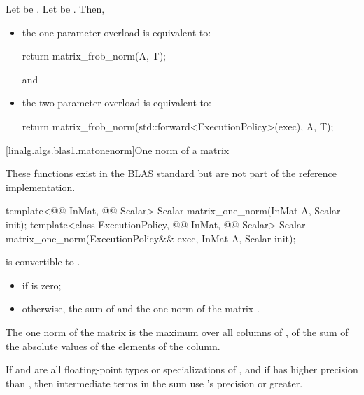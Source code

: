 \begin{itemdescr}
\pnum
\effects
Let  be
.
Let  be
.
Then,
\begin{itemize}
\item
the one-parameter overload is equivalent to:
\begin{codeblock}
return matrix_frob_norm(A, T{});
\end{codeblock}
and
\item
the two-parameter overload is equivalent to:
\begin{codeblock}
return matrix_frob_norm(std::forward<ExecutionPolicy>(exec), A, T{});
\end{codeblock}
\end{itemize}
\end{itemdescr}

[linalg.algs.blas1.matonenorm]{One norm of a matrix}

\pnum
\begin{note}
These functions exist in the BLAS standard\supercite{blas-std}
but are not part of the reference implementation.
\end{note}

%
\begin{itemdecl}
template<@@ InMat, @@ Scalar>
  Scalar matrix_one_norm(InMat A, Scalar init);
template<class ExecutionPolicy, @@ InMat, @@ Scalar>
  Scalar matrix_one_norm(ExecutionPolicy&& exec, InMat A, Scalar init);
\end{itemdecl}

\begin{itemdescr}
\pnum
\mandates
{}
is convertible to .

\pnum
\returns
\begin{itemize}
\item
{} if  is zero;
\item
otherwise, the sum of  and the one norm of the matrix .
\end{itemize}
\begin{note}
The one norm of the matrix 
is the maximum over all columns of ,
of the sum of the absolute values of the elements of the column.
\end{note}

\pnum
\remarks
If  and 
are all floating-point types or specializations of ,
and if  has higher precision
than ,
then intermediate terms in the sum use 's precision or greater.
\end{itemdescr}

